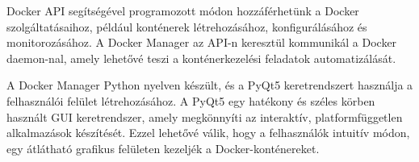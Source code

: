 Docker API segítségével programozott módon hozzáférhetünk a Docker szolgáltatásaihoz, például konténerek létrehozásához, konfigurálásához és monitorozásához. A Docker Manager az API-n keresztül kommunikál a Docker daemon-nal, amely lehetővé teszi a konténerkezelési feladatok automatizálását.

A Docker Manager Python nyelven készült, és a PyQt5 keretrendszert használja a felhasználói felület létrehozásához. A PyQt5 egy hatékony és széles körben használt GUI keretrendszer, amely megkönnyíti az interaktív, platformfüggetlen alkalmazások készítését. Ezzel lehetővé válik, hogy a felhasználók intuitív módon, egy átlátható grafikus felületen kezeljék a Docker-konténereket.